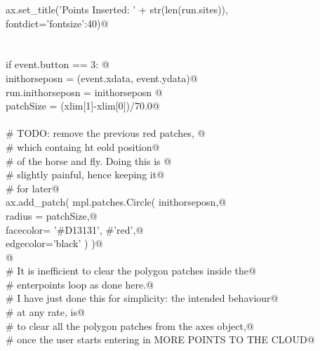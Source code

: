 \documentclass[11.5pt]{report}
\begin{document}
\begin{flushleft}
\begin{list}{}{}
\mbox{}\verb@               ax.set_title('Points Inserted: ' + str(len(run.sites)), \@\\
\mbox{}\verb@                             fontdict={'fontsize':40})@\\
\mbox{}\verb@@\\
\mbox{}\verb@@\\
\mbox{}\verb@             if event.button == 3:        @\\
\mbox{}\verb@                 inithorseposn = (event.xdata, event.ydata)@\\
\mbox{}\verb@                 run.inithorseposn = inithorseposn  @\\
\mbox{}\verb@                 patchSize  = (xlim[1]-xlim[0])/70.0@\\
\mbox{}\verb@@\\
\mbox{}\verb@                 # TODO: remove the previous red patches, @\\
\mbox{}\verb@                 # which containg ht eold position@\\
\mbox{}\verb@                 # of the horse and fly. Doing this is @\\
\mbox{}\verb@                 # slightly painful, hence keeping it@\\
\mbox{}\verb@                 # for later@\\
\mbox{}\verb@                 ax.add_patch( mpl.patches.Circle( inithorseposn,@\\
\mbox{}\verb@                                                   radius = patchSize,@\\
\mbox{}\verb@                                                   facecolor= '#D13131', #'red',@\\
\mbox{}\verb@                                                   edgecolor='black'   )  )@\\
\mbox{}\verb@                 @\\
\mbox{}\verb@             # It is inefficient to clear the polygon patches inside the@\\
\mbox{}\verb@             # enterpoints loop as done here.@\\
\mbox{}\verb@             # I have just done this for simplicity: the intended behaviour@\\
\mbox{}\verb@             # at any rate, is@\\
\mbox{}\verb@             # to clear all the polygon patches from the axes object,@\\
\mbox{}\verb@             # once the user starts entering in MORE POINTS TO THE CLOUD@\\

\end{list}
\end{flushleft}
\end{document}
